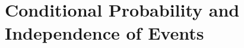 \chapterspaceabove{6.75cm} 
\chapterspacebelow{7.25cm} 
\chapter{Conditional Probability and Independence of Events}